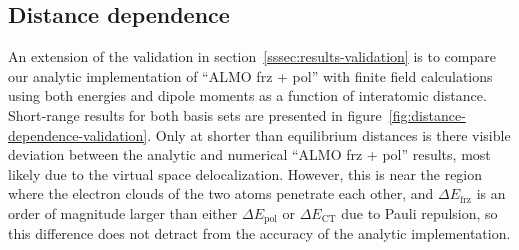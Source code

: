 \documentclass[%
  class = book,%
  crop = false,%
  float = true,%
  multi = true,%
  preview = false,%
]{standalone}
\begin{document}
\subsection{Distance dependence}
\label{ssec:results-distance-dependence}

An extension of the validation in section~\ref{sssec:results-validation} is to compare our analytic implementation of ``ALMO frz + pol'' with finite field calculations using both energies and dipole moments as a function of interatomic distance. Short-range results for both basis sets are presented in figure~\ref{fig:distance-dependence-validation}. Only at shorter than equilibrium distances is there visible deviation between the analytic and numerical ``ALMO frz + pol'' results, most likely due to the virtual space delocalization. However, this is near the region where the electron clouds of the two atoms penetrate each other, and \(\Delta E_{\text{frz}}\) is an order of magnitude larger than either \(\Delta E_{\text{pol}}\) or \(\Delta E_{\text{CT}}\) due to Pauli repulsion, so this difference does not detract from the accuracy of the analytic implementation.
\end{document}
